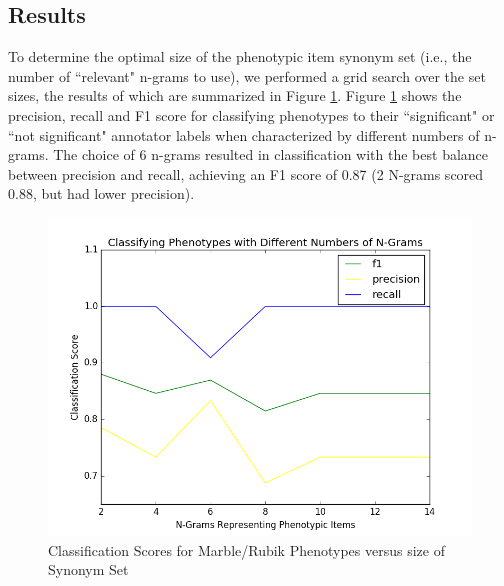 \documentclass{sig-alternate-05-2015}
\begin{document}

\subsection{Results}
To determine the optimal size of the phenotypic item synonym set (i.e., the number of ``relevant" n-grams to use), we performed a grid search over the set sizes, the results of which are summarized in Figure \ref{fig:classificationVarNG}.
Figure \ref{fig:classificationVarNG} shows the precision, recall and F1 score for classifying phenotypes to their ``significant" or ``not significant" annotator labels when characterized by different numbers of n-grams. 
The choice of 6 n-grams resulted in classification with the best balance between precision and recall, achieving an F1 score of 0.87 (2 N-grams scored 0.88, but had lower precision).

\begin{figure} [t]
\centering
\includegraphics[width=\linewidth] {classificationWithVariableNG.png}
\caption{Classification Scores for Marble/Rubik Phenotypes versus size of Synonym Set}
\label{fig:classificationVarNG}
\end{figure}
\end{document}
